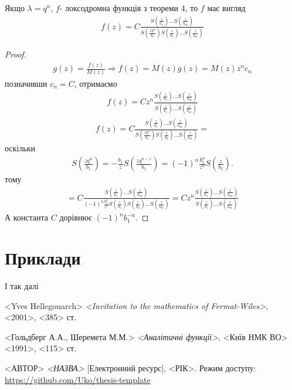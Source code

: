 \documentclass[12pt,a4paper]{article}
\begin{document}
\begin{thm}
Якщо $\lambda =q^{n}$, $f$- локсодромна функція з теореми 4, то  $f$ має вигляд
\begin{equation}\label{th51}
\begin{array}{l}
 f(z)= C\tfrac{S(\frac{z}{a_{1}})...S(\frac{z}{a_{m}})}{S(\frac{zq^{n}}{b_{1}})S(\frac{z}{b_{2}})...S(\frac{z}{b_{m}})}
\end{array}
\end{equation}
 \end{thm}
\begin{proof}
\[\begin{array}{l}
g(z)=\frac{f(z)}{M(z)}\Rightarrow f(z)=M(z)g(z)= M(z)z^{n}c_{n}
 \end{array}\]
 позначивши $c_{n}=C$, отримаємо 
 \begin{equation}\label{th52}
\begin{array}{l} 
f(z) =Cz^{n}\frac{S(\frac{z}{a_{1}})...S(\frac{z}{a_{m}})}{S(\frac{z}{b_{1}})...S(\frac{z}{b_{m}})} 
\end{array}
  \end{equation}
\[\begin{array}{l}
f(z)=C\tfrac{S(\frac{z}{a_{1}})...S(\frac{z}{a_{m}})}{S(\frac{zq^{n}}{b_{1}})S(\frac{z}{b_{2}})...S(\frac{z}{b_{m}})}= 
 \end{array}\]
оскільки
\[\begin{array}{l}
S(\frac{zq^{n}}{b_{1}})= -\frac{b_{1}}{z}S(\frac{zq^{n-1}}{b_{1}})=(-1)^{n}\frac{b_{1}^{n}}{z^{n}}S(\frac{z}{b_{1}}).
 \end{array}\]
тому
\[\begin{array}{l}
 =C\tfrac{S(\frac{z}{a_{1}})...S(\frac{z}{a_{m}})}{(-1)^{n}\frac{b_{1}^{n}}{z^{n}} S(\frac{z}{b_{1}})S(\frac{z}{b_{2}})...S(\frac{z}{b_{m}})}=Cz^{n}\frac{S(\frac{z}{a_{1}})...S(\frac{z}{a_{m}})}{S(\frac{z}{b_{1}})...S(\frac{z}{b_{m}})} 
  \end{array}\]
А константа $C$ дорівнює $(-1)^{n}b_{1}^{-n}$.
\end{proof}


\clearpage
\section{Приклади}
І так далі\cite{web}



\clearpage
{}
\begin{thebibliography}{9}

  <Yves Hellegouarch> \emph{<Invitation to the mathematics of Fermat-Wiles>},
    <2001>, <385> ст.
    
  <Гольдберг А.А., Шеремета М.М.> \emph{<Аналітичні функції>},
    <Київ НМК ВО> <1991>, <115> ст.
      
  <АВТОР> \emph{<НАЗВА>} [Електронний ресурс],
    <РІК>. Режим доступу:
    \url{https://github.com/Uko/thesis-template}

\end{thebibliography}
\end{document}
